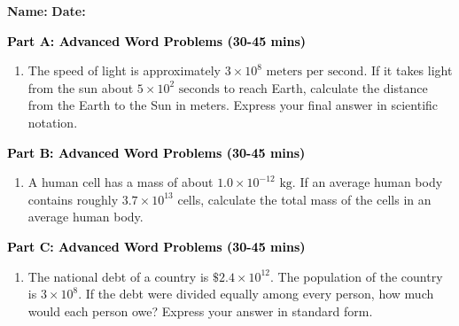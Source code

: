 \documentclass[12pt, letterpaper, fleqn]{article}
\begin{document}
\textbf{Name:} \underline{\hspace{5cm}}
\hfill
\textbf{Date:} \underline{\hspace{3cm}}\\


\begin{tcolorbox}[colback=customteal!20]
\large\textcolor{black}{\textbf{Part A: Advanced Word Problems (30-45 mins)}}
\end{tcolorbox}

\vspace{3mm}

\begin{enumerate}[itemsep=5.5cm, leftmargin=0.6cm]
\item The speed of light is approximately $3 \times 10^8\text{ meters per second}$. If it takes light from the sun about $5 \times 10^2\text{ seconds}$ to reach Earth, calculate the distance from the Earth to the Sun in meters. Express your final answer in scientific notation.
\end{enumerate}

\newpage

\begin{tcolorbox}[colback=customteal!20]
\large\textcolor{black}{\textbf{Part B: Advanced Word Problems (30-45 mins)}}
\end{tcolorbox}

\vspace{3mm}

\begin{enumerate}[itemsep=5.5cm, leftmargin=0.6cm, resume]
\item A human cell has a mass of about $1.0 \times 10^{-12}\text{ kg}$. If an average human body contains roughly $3.7 \times 10^{13}$ cells, calculate the total mass of the cells in an average human body.
\end{enumerate}

\newpage

\begin{tcolorbox}[colback=customteal!20]
\large\textcolor{black}{\textbf{Part C: Advanced Word Problems (30-45 mins)}}
\end{tcolorbox}

\vspace{3mm}

\begin{enumerate}[itemsep=5.5cm, leftmargin=0.6cm, resume]
\item The national debt of a country is $\$2.4 \times 10^{12}$. The population of the country is $3 \times 10^8$. If the debt were divided equally among every person, how much would each person owe? Express your answer in standard form.
\end{enumerate}
\end{document}
